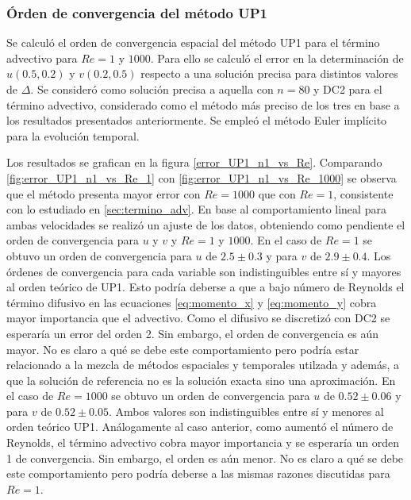 \documentclass[aps,prb,twocolumn,superscriptaddress,floatfix,longbibliography,10pt]{revtex4-2}
\newcounter{para}
\begin{document}
\subsubsection{Órden de convergencia del método UP1}

Se calculó el orden de convergencia espacial del método UP1 para el término advectivo para $Re = 1$ y $1000$. Para ello se calculó el error en la determinación de $u(0.5, 0.2)$ y $v(0.2, 0.5)$ respecto a una solución precisa para distintos valores de $\Delta$. Se consideró como solución precisa a aquella con $n = 80$ y DC2 para el término advectivo, considerado como el método más preciso de los tres en base a los resultados presentados anteriormente. Se empleó el método Euler implícito para la evolución temporal.

Los resultados se grafican en la figura \ref{error_UP1_n1_vs_Re}. Comparando \ref{fig:error_UP1_n1_vs_Re_1} con \ref{fig:error_UP1_n1_vs_Re_1000} se observa que el método presenta mayor error con $Re = 1000$ que con $Re = 1$, consistente con lo estudiado en \ref{sec:termino_adv}. En base al comportamiento lineal para ambas velocidades se realizó un ajuste de los datos, obteniendo como pendiente el orden de convergencia para $u$ y $v$ y $Re = 1$ y $1000$. En el caso de $Re = 1$ se obtuvo un orden de convergencia para $u$ de $2.5 \pm 0.3$ y para $v$ de $2.9 \pm 0.4$. Los órdenes de convergencia para cada variable son indistinguibles entre sí y mayores al orden teórico de UP1. Esto podría deberse a que a bajo número de Reynolds el término difusivo en las ecuaciones \ref{eq:momento_x} y \ref{eq:momento_y} cobra mayor importancia que el advectivo. Como el difusivo se discretizó con DC2 se esperaría un error del orden 2. Sin embargo, el orden de convergencia es aún mayor. No es claro a qué se debe este comportamiento pero podría estar relacionado a la mezcla de métodos espaciales y temporales utilzada y además, a que la solución de referencia no es la solución exacta sino una aproximación. En el caso de $Re = 1000$ se obtuvo un orden de convergencia para $u$ de $0.52 \pm 0.06$ y para $v$ de $0.52 \pm 0.05$. Ambos valores son indistinguibles entre sí y menores al orden teórico UP1. Análogamente al caso anterior, como aumentó el número de Reynolds, el término advectivo cobra mayor importancia y se esperaría un orden 1 de convergencia. Sin embargo, el orden es aún menor. No es claro a qué se debe este comportamiento pero podría deberse a las mismas razones discutidas para $Re = 1$.
\end{document}
